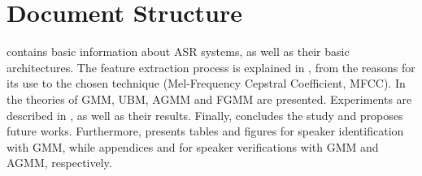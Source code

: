 \section{Document Structure}

 contains basic information about ASR systems, as well as their basic architectures. The feature extraction process is explained in , from the reasons for its use to the chosen technique (Mel-Frequency Cepstral Coefficient, MFCC). In  the theories of GMM, UBM, AGMM and FGMM are presented. Experiments are described in , as well as their results. Finally,  concludes the study and proposes future works. Furthermore,  presents tables and figures for speaker identification with GMM, while appendices  and  for speaker verifications with GMM and AGMM, respectively.